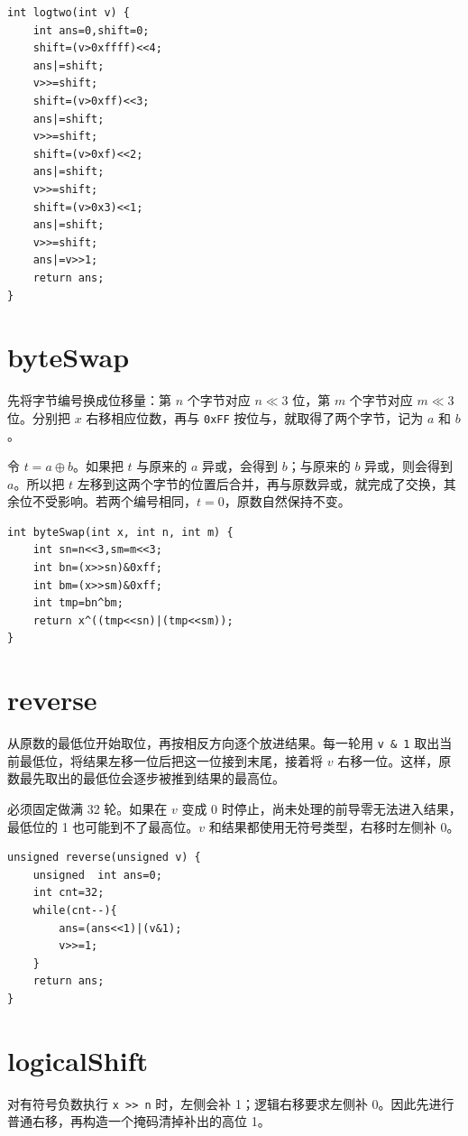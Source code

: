 \documentclass[12pt,a4paper]{ctexart}
\begin{document}
\begin{lstlisting}
int logtwo(int v) {
    int ans=0,shift=0;
    shift=(v>0xffff)<<4;
    ans|=shift;
    v>>=shift;
    shift=(v>0xff)<<3;
    ans|=shift;
    v>>=shift;
    shift=(v>0xf)<<2;
    ans|=shift;
    v>>=shift;
    shift=(v>0x3)<<1;
    ans|=shift;
    v>>=shift;
    ans|=v>>1;
    return ans;
}
\end{lstlisting}

\section{byteSwap}
先将字节编号换成位移量：第 $n$ 个字节对应 $n\ll3$ 位，第 $m$ 个字节对应 $m\ll3$ 位。分别把 $x$ 右移相应位数，再与 \texttt{0xFF} 按位与，就取得了两个字节，记为 $a$ 和 $b$。

令 $t=a\oplus b$。如果把 $t$ 与原来的 $a$ 异或，会得到 $b$；与原来的 $b$ 异或，则会得到 $a$。所以把 $t$ 左移到这两个字节的位置后合并，再与原数异或，就完成了交换，其余位不受影响。若两个编号相同，$t=0$，原数自然保持不变。

\begin{lstlisting}
int byteSwap(int x, int n, int m) {
    int sn=n<<3,sm=m<<3;
    int bn=(x>>sn)&0xff;
    int bm=(x>>sm)&0xff;
    int tmp=bn^bm;
    return x^((tmp<<sn)|(tmp<<sm));
}
\end{lstlisting}

\section{reverse}
从原数的最低位开始取位，再按相反方向逐个放进结果。每一轮用 \texttt{v \& 1} 取出当前最低位，将结果左移一位后把这一位接到末尾，接着将 $v$ 右移一位。这样，原数最先取出的最低位会逐步被推到结果的最高位。

必须固定做满 32 轮。如果在 $v$ 变成 0 时停止，尚未处理的前导零无法进入结果，最低位的 1 也可能到不了最高位。$v$ 和结果都使用无符号类型，右移时左侧补 0。

\begin{lstlisting}
unsigned reverse(unsigned v) {
    unsigned  int ans=0;
    int cnt=32;
    while(cnt--){
        ans=(ans<<1)|(v&1);
        v>>=1;
    }
    return ans;
}
\end{lstlisting}

\section{logicalShift}
对有符号负数执行 \texttt{x >> n} 时，左侧会补 1；逻辑右移要求左侧补 0。因此先进行普通右移，再构造一个掩码清掉补出的高位 1。
\end{document}
